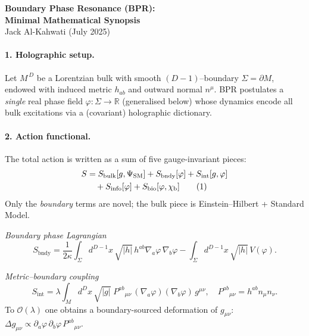 \documentclass[11pt]{article}
\begin{document}
\begin{center}
  {\LARGE\bf Boundary Phase Resonance (BPR):\\
             Minimal Mathematical Synopsis}\\[6pt]
  \small Jack Al-Kahwati \quad (July 2025)
\end{center}

\paragraph{1. Holographic setup.}
Let $M^{\,D}$ be a Lorentzian bulk with smooth $(D\!-\!1)$–boundary
$\Sigma=\partial M$, endowed with induced metric $h_{ab}$ and outward
normal $n^\mu$.  BPR postulates a \emph{single} real phase field
$\varphi:\Sigma\to\mathbb R$ (generalised below) whose dynamics
encode all bulk excitations via a (covariant) holographic dictionary.

\paragraph{2. Action functional.}
The total action is written as a sum of five gauge-invariant pieces:
\begin{align}
  S &= S_{\text{bulk}}[g,\Psi_{\text{SM}}]
      + S_{\text{bndy}}[\varphi]
      + S_{\text{int}}[g,\varphi]     \nonumber\\
    &\quad + S_{\text{info}}[\varphi]
      + S_{\text{bio}}[\varphi,\chi_{\text b}]                      \tag{1}
\end{align}
Only the \emph{boundary} terms are novel; the bulk piece is
Einstein–Hilbert + Standard Model.

\smallskip
\noindent\emph{Boundary phase Lagrangian}
\begin{equation}
  S_{\text{bndy}}
    = \frac{1}{2\kappa}\!
      \int_\Sigma\! d^{D-1}\!x\,\sqrt{|h|}\,
      h^{ab}\nabla_a\varphi\,\nabla_b\varphi
      -\!\int_\Sigma\! d^{D-1}\!x\,\sqrt{|h|}\,V(\varphi).        \tag{2}
\end{equation}

\smallskip
\noindent\emph{Metric–boundary coupling}
\begin{equation}
  S_{\text{int}}
   = \lambda
     \int_M\! d^{D}x\,\sqrt{|g|}\;
     P^{ab}{}_{\mu\nu}\,
     (\nabla_a\varphi)(\nabla_b\varphi)\,g^{\mu\nu},
  \quad P^{ab}{}_{\mu\nu}=h^{ab}n_\mu n_\nu.                      \tag{3}
\end{equation}
To $\mathcal O(\lambda)$ one obtains a boundary-sourced deformation
of $g_{\mu\nu}$:
$\Delta g_{\mu\nu} \propto \partial_a\varphi\,\partial_b\varphi\,P^{ab}{}_{\mu\nu}$.
\end{document}
